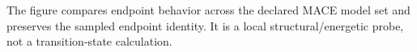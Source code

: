 The figure compares endpoint behavior across the declared MACE model set and preserves the sampled endpoint identity. It is a local structural/energetic probe, not a transition-state calculation.
